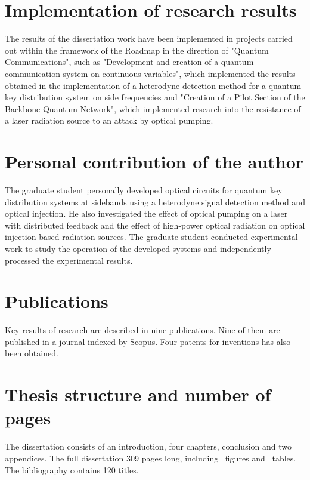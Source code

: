 \section*{Implementation of research results}
The results of the dissertation work have been implemented in projects carried out within the framework of the Roadmap in the direction of "Quantum Communications", such as "Development and creation of a quantum communication system on continuous variables", which implemented the results obtained in the implementation of a heterodyne detection method for a quantum key distribution system on side frequencies and "Creation of a Pilot Section of the Backbone Quantum Network", which implemented research into the resistance of a laser radiation source to an attack by optical pumping.

\section*{Personal contribution of the author}
The graduate student personally developed optical circuits for quantum key distribution systems at sidebands using a heterodyne signal detection method and optical injection. He also investigated the effect of optical pumping on a laser with distributed feedback and the effect of high-power optical radiation on optical injection-based radiation sources. The graduate student conducted experimental work to study the operation of the developed systems and independently processed the experimental results.
\section*{Publications}
Key results of research are described in nine publications. Nine of them are  published in a journal indexed by Scopus. Four patents for inventions has also been obtained.\\

\section*{Thesis structure and number of pages} The dissertation consists of an introduction, four chapters, conclusion and two appendices. The full dissertation 309 pages long, including \totalfigures\ figures and \totaltables\ tables. The bibliography contains 120 titles.

